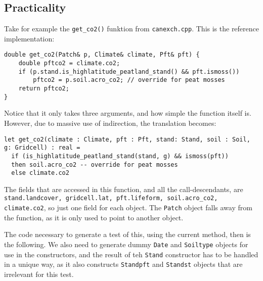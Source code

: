 \subsection{Practicality}
Take for example the \texttt{get_co2()} funktion from \texttt{canexch.cpp}. This is the reference implementation:
\begin{verbatim}
double get_co2(Patch& p, Climate& climate, Pft& pft) {
	double pftco2 = climate.co2;
	if (p.stand.is_highlatitude_peatland_stand() && pft.ismoss())
		pftco2 = p.soil.acro_co2; // override for peat mosses
	return pftco2;
}
\end{verbatim}
Notice that it only takes three arguments, and how simple the function itself is. However, due to massive use of indirection, the translation becomes:

\begin{verbatim}
let get_co2(climate : Climate, pft : Pft, stand: Stand, soil : Soil, g: Gridcell) : real =
  if (is_highlatitude_peatland_stand(stand, g) && ismoss(pft))
  then soil.acro_co2 -- override for peat mosses
  else climate.co2
\end{verbatim}

The fields that are accessed in this function, and all the call-descendants, are \texttt{stand.landcover, gridcell.lat, pft.lifeform, soil.acro_co2, climate.co2}, so just one field for each object. The \texttt{Patch} object falls away from the function, as it is only used to point to another object.

The code necessary to generate a test of this, using the current method, then is the following. We also need to generate dummy \texttt{Date} and \texttt{Soiltype} objects for use in the constructors, and the result of teh \texttt{Stand} constructor has to be handled in a unique way, as it also constructs \texttt{Standpft} and \texttt{Standst} objects that are irrelevant for this test.

